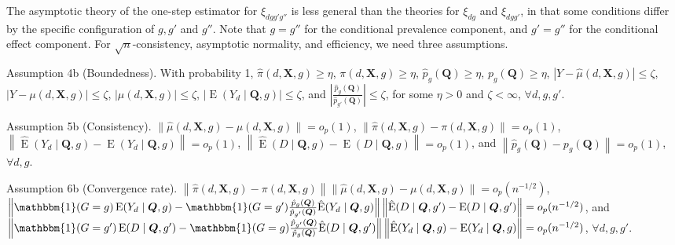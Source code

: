 \documentclass[12pt,a4paper]{article}
\newcommand{\E}{\operatorname{E}}
\def\X{{\boldsymbol X}}
\def\Q{{\boldsymbol Q}}
\def\one{\mathbbm{1}}
\begin{document}
The asymptotic theory of the one-step estimator for $\xi_{dgg'g''}$ is less general than the theories for $\xi_{dg}$ and $\xi_{dgg'}$, in that some conditions differ by the specific configuration of $g, g'$ and $g''$. Note that  $g=g''$ for the conditional prevalence component, and $g'=g''$ for the conditional effect component. For $\sqrt{n}$-consistency, asymptotic normality, and efficiency, we need three assumptions. 

Assumption 4b (Boundedness). With probability 1,  $\hat{\pi}(d,\X,g) \geq \eta$, $\pi(d,\X,g) \geq \eta$, $\hat{p}_g(\Q) \geq \eta$, $p_g(\Q) \geq \eta$, 
$|Y-\hat{\mu}(d,\X,g)| \leq \zeta$, 
$|Y-\mu(d,\X,g)| \leq \zeta$, 
$|\mu(d,\X,g)| \leq \zeta$,
$|\E(Y_d \mid \Q,g)| \leq \zeta$, and $\left| \frac{\hat{p}_g(\Q)}{\hat{p}_{g'}(\Q)} \right| \leq \zeta$, for some $\eta>0$ and $\zeta < \infty$, $\forall d,g,g'$.

Assumption 5b (Consistency). $\| \hat{\mu}(d,\X,g) - \mu(d,\X,g) \| =o_p(1)$, $\| \hat{\pi}(d,\X,g) - \pi(d,\X,g) \| =o_p(1)$, $\left\| \hat{\E}(Y_d \mid \Q,g) - \E(Y_d \mid \Q,g) \right\| =o_p(1)$, $\left\| \hat{\E}(D \mid \Q,g) - \E(D \mid \Q,g) \right\| =o_p(1)$, and $\left\| \hat{p}_g(\Q) -p_g(\Q) \right\|=o_p(1)$, $\forall d,g$.

Assumption 6b (Convergence rate). $\left\|\hat{\pi}(d,\X,g)-\pi(d,\X,g) \right\| \|\hat{\mu}(d,\X,g)-\mu(d,\X,g)\|=o_p(n^{-1/2})$, $\left\| \one(G=g) \E(Y_d \mid \Q,g) - \one(G=g')\frac{\hat{p}_{g}(\Q)}{\hat{p}_{g'}(\Q)} \hat{\E}( Y_d \mid \Q, g ) \right\| \left\| \hat{\E}(D \mid \Q, g') - \E(D \mid \Q, g') \right\| = o_p(n^{-1/2})$, and $\left\| \one(G=g') \E(D \mid \Q,g') - \one(G=g) \frac{\hat{p}_{g'}(\Q) }{\hat{p}_g(\Q) } \hat{\E}(D \mid \Q,g') \right\| \left\| \hat{\E}(Y_d \mid \Q,g) - \E(Y_d \mid \Q,g)  \right\| = o_p(n^{-1/2})$, $\forall d,g,g'$.
\end{document}

